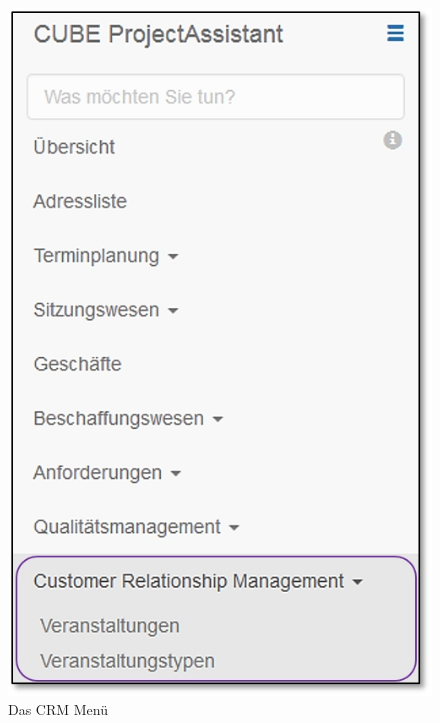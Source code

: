 \begin{figure}   %
  \vspace{-35pt}      %
  \begin{center}
    \includegraphics[width=1\linewidth]{../chapters/10_CRM/pictures/10-1-1_Menu_CRM.jpg}
  \end{center}
  \vspace{-20pt}
  \caption{Das CRM Menü}
  \vspace{-10pt}
\end{figure}

